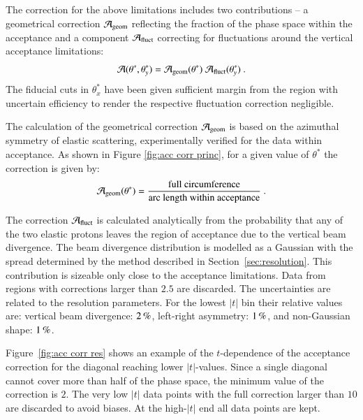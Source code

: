 The correction for the above limitations includes two contributions -- a geometrical correction ${\cal A}_{\rm geom}$ reflecting the fraction of the phase space within the acceptance and a component ${\cal A}_{\rm fluct}$ correcting for fluctuations around the vertical acceptance limitations:
\begin{equation}
{\cal A}(\theta^*, \theta_y^*) = {\cal A}_{\rm geom}(\theta^*)\ {\cal A}_{\rm fluct}(\theta_y^*)\ .
\end{equation}
The fiducial cuts in $\theta_x^*$ have been given sufficient margin from the region with uncertain efficiency to render the respective fluctuation correction negligible.

The calculation of the geometrical correction ${\cal A}_{\rm geom}$ is based on the azimuthal symmetry of elastic scattering, experimentally verified for the data within acceptance. As shown in Figure \ref{fig:acc corr princ}, for a given value of $\theta^*$ the correction is given by:
\begin{equation}
\label{eq:acc geom}
{\cal A_{\rm geom}}(\theta^*) = {
	\hbox{full circumference}\over 
	\hbox{arc length within acceptance}
} \ .
\end{equation}

The correction ${\cal A}_{\rm fluct}$ is calculated analytically from the probability that any of the two elastic protons leaves the region of acceptance due to the vertical beam divergence. The beam divergence distribution is modelled as a Gaussian with the spread determined by the method described in Section~\ref{sec:resolution}. This contribution is sizeable only close to the acceptance limitations. Data from regions with corrections larger than $2.5$ are discarded. The uncertainties are related to the resolution parameters. For the lowest $|t|$ bin their relative values are: vertical beam divergence: $2\,{\rm \%}$, left-right asymmetry: $1\,{\rm \%}$, and non-Gaussian shape: $1\,{\rm \%}$.

Figure~\ref{fig:acc corr res} shows an example of the $t$-dependence of the acceptance correction for the diagonal reaching lower $|t|$-values. Since a single diagonal cannot cover more than half of the phase space, the minimum value of the correction is $2$. The very low $|t|$ data points with the full correction larger than $10$ are discarded to avoid biases. At the high-$|t|$ end all data points are kept.


